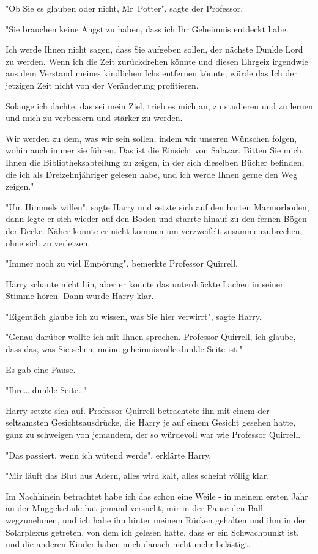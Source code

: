 {"Ob Sie es glauben oder nicht, Mr~Potter", sagte der Professor,

"Sie brauchen keine Angst zu haben, dass ich Ihr Geheimnis entdeckt habe.

Ich werde Ihnen nicht sagen, dass Sie aufgeben sollen, der nächste Dunkle Lord zu werden. Wenn ich die Zeit zurückdrehen könnte und diesen Ehrgeiz irgendwie aus dem Verstand meines kindlichen Ichs entfernen könnte, würde das Ich der jetzigen Zeit nicht von der Veränderung profitieren.

Solange ich dachte, das sei mein Ziel, trieb es mich an, zu studieren und zu lernen und mich zu verbessern und stärker zu werden.

Wir werden zu dem, was wir sein sollen, indem wir unseren Wünschen folgen, wohin auch immer sie führen. Das ist die Einsicht von Salazar. Bitten Sie mich, Ihnen die Bibliotheksabteilung zu zeigen, in der sich dieselben Bücher befinden, die ich als Dreizehnjähriger gelesen habe, und ich werde Ihnen gerne den Weg zeigen."

"Um Himmels willen", sagte Harry und setzte sich auf den harten Marmorboden, dann legte er sich wieder auf den Boden und starrte hinauf zu den fernen Bögen der Decke. Näher konnte er nicht kommen um verzweifelt zusammenzubrechen, ohne sich zu verletzen.

"Immer noch zu viel Empörung", bemerkte Professor Quirrell.

Harry schaute nicht hin, aber er konnte das unterdrückte Lachen in seiner Stimme hören. Dann wurde Harry klar.

"Eigentlich glaube ich zu wissen, was Sie hier verwirrt", sagte Harry.

"Genau darüber wollte ich mit Ihnen sprechen. Professor Quirrell, ich glaube, dass das, was Sie sehen, meine geheimnisvolle dunkle Seite ist."

Es gab eine Pause.

"Ihre… dunkle Seite…"

Harry setzte sich auf. Professor Quirrell betrachtete ihn mit einem der seltsamsten Gesichtsausdrücke, die Harry je auf einem Gesicht gesehen hatte, ganz zu schweigen von jemandem, der so würdevoll war wie Professor Quirrell.

"Das passiert, wenn ich wütend werde", erklärte Harry.

"Mir läuft das Blut aus Adern, alles wird kalt, alles scheint völlig klar.

Im Nachhinein betrachtet habe ich das schon eine Weile - in meinem ersten Jahr an der Muggelschule hat jemand versucht, mir in der Pause den Ball wegzunehmen, und ich habe ihn hinter meinem Rücken gehalten und ihm in den Solarplexus getreten, von dem ich gelesen hatte, dass er ein Schwachpunkt ist, und die anderen Kinder haben mich danach nicht mehr belästigt.

}

